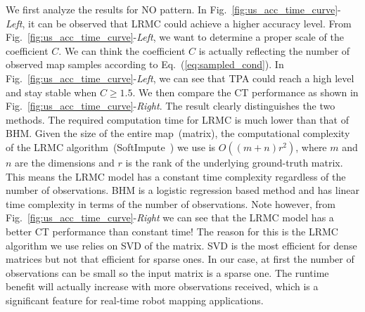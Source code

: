 We first analyze the results for NO pattern. In Fig.~\ref{fig:us_acc_time_curve}-\textit{Left}, it can be observed that 
LRMC could achieve a higher accuracy level. 
From Fig.~\ref{fig:us_acc_time_curve}-\textit{Left}, we want to determine a proper scale of the coefficient $C$. We can think the coefficient $C$ is actually reflecting the number of observed map samples according to Eq.~(\ref{eq:sampled_cond}). 
In Fig.~\ref{fig:us_acc_time_curve}-\textit{Left}, we can see that TPA could reach a high level and stay stable when $C\geq 1.5$.
We then compare the CT performance as shown in Fig.~\ref{fig:us_acc_time_curve}-\textit{Right}. The result clearly distinguishes the two methods. The required computation time for LRMC is much lower than that of BHM. Given the size of the entire map~(matrix), the computational complexity of the LRMC algorithm~(SoftImpute~\cite{mazumder2010spectral}) we use is $O((m+n)r^2)$, where $m$ and $n$ are the dimensions and $r$ is the rank of the underlying ground-truth matrix. This means the LRMC model has a constant time complexity regardless of the number of observations. BHM is a logistic regression based method and has linear time complexity in terms of the number of observations. 
Note however, from Fig.~\ref{fig:us_acc_time_curve}-\textit{Right} we can see that the LRMC model has a better CT performance than constant time! The reason for this is the LRMC algorithm we use relies on SVD of the matrix. SVD is the most efficient for  dense matrices but not that efficient for sparse ones. In our case,   at first the number of observations can be small so the input matrix is a sparse one. 
The runtime benefit will actually  increase with more observations received, which is a significant feature for real-time robot mapping applications.  

